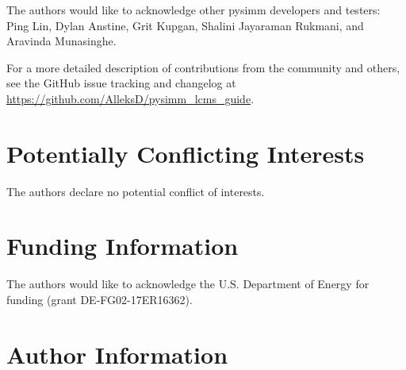 \documentclass[9pt,tutorial]{livecoms}
\newcommand{\githubrepository}{\url{https://github.com/AlleksD/pysimm_lcms_guide}}
\begin{document}
The authors would like to acknowledge other pysimm developers and testers: Ping Lin, Dylan Anstine, Grit Kupgan, Shalini Jayaraman Rukmani, and Aravinda Munasinghe. 

For a more detailed description of contributions from the community and others, see the GitHub issue tracking and changelog at \githubrepository.

\section{Potentially Conflicting Interests}

The authors declare no potential conflict of interests.

\section{Funding Information}
The authors would like to acknowledge the U.S. Department of Energy for funding (grant DE-FG02-17ER16362).

\section*{Author Information}
\makeorcid




\end{document}

